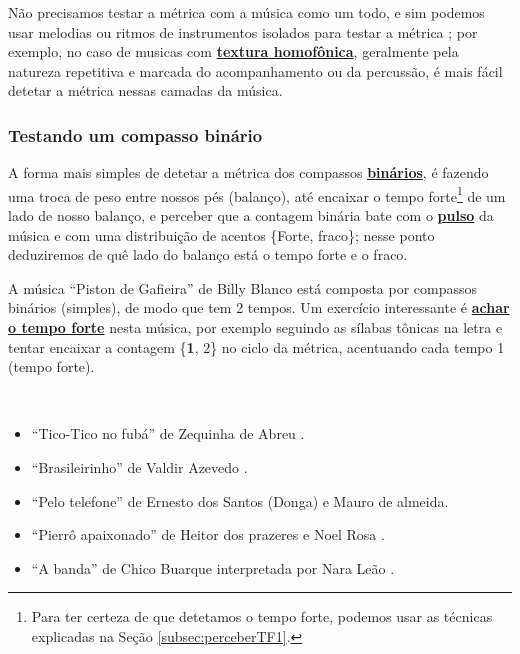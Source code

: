 Não precisamos testar a métrica com a música como um todo,
e sim podemos usar melodias ou ritmos de instrumentos isolados para testar a métrica \cite[pp. 10]{wright1992social};
por exemplo, no caso de musicas com \hyperref[subsec:homofonica]{\textbf{textura homofônica}},
geralmente pela natureza repetitiva e marcada do acompanhamento ou da percussão,
é mais fácil detetar a métrica nessas camadas da música.

\subsubsection{Testando um compasso binário}
A forma mais simples de detetar a métrica dos compassos \hyperref[subsec:compassobinario]{\textbf{binários}},
é fazendo uma troca de peso entre nossos pés (balanço),
até encaixar o tempo forte\footnote{Para ter certeza de que detetamos o tempo forte, 
podemos usar as técnicas explicadas na Seção \ref{subsec:perceberTF1}.} 
de um lado de nosso balanço,
e perceber que a contagem binária bate com o \hyperref[ref:Pulso]{\textbf{pulso}} da música 
e com uma distribuição de acentos \{Forte, fraco\};
nesse ponto deduziremos de quê lado do balanço está o tempo forte e o fraco.

\begin{example}
\label{ex:compassosimples3t}
A música ``Piston de Gafieira'' de Billy Blanco 
está composta por compassos binários (simples), de modo que tem 2 tempos.
Um exercício interessante é \hyperref[subsec:perceberTF1]{\textbf{achar o tempo forte}} nesta música,
por exemplo seguindo as sílabas tônicas na letra 
e tentar encaixar a contagem \{\textbf{1}, 2\} no ciclo da métrica, acentuando cada tempo 1 (tempo forte). 
\end{example}

\begin{example}
~
\begin{itemize}
\item ``Tico-Tico no fubá'' de Zequinha de Abreu  \cite[pp. 6]{marcondes1998enciclopedia} \cite[pp. 39,91]{diniz2003almanaque}.
\item ``Brasileirinho'' de Valdir Azevedo  \cite[pp. 133]{perna2002samba}.
\item ``Pelo telefone'' de  Ernesto dos Santos (Donga) e Mauro de almeida.
\item ``Pierrô apaixonado'' de Heitor dos prazeres e Noel Rosa \cite[pp. 1070]{marcondes1977enciclopediav2} \cite[pp. 53]{diniz2008almanaque}.
\item ``A banda'' de Chico Buarque interpretada por Nara Leão \cite[pp. 90]{diniz2008almanaque} \cite{partituraabanda1}.
\end{itemize}
\end{example}


